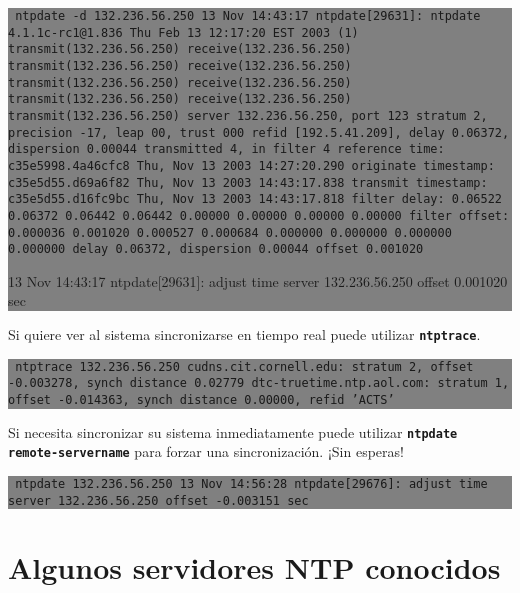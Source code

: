 \documentclass[12pt]{article}
\begin{document}
\colorbox{grey}{\parbox[t]{0.95\linewidth}{ \vspace*{0.5cm} {\tt 
ntpdate -d 132.236.56.250
13 Nov 14:43:17 ntpdate[29631]: ntpdate 4.1.1c-rc1@1.836 Thu Feb 13 12:17:20 EST 2003 (1)
transmit(132.236.56.250)
receive(132.236.56.250)
transmit(132.236.56.250)
receive(132.236.56.250)
transmit(132.236.56.250)
receive(132.236.56.250)
transmit(132.236.56.250)
receive(132.236.56.250)
transmit(132.236.56.250)
server 132.236.56.250, port 123
stratum 2, precision -17, leap 00, trust 000
refid [192.5.41.209], delay 0.06372, dispersion 0.00044
transmitted 4, in filter 4
reference time:    c35e5998.4a46cfc8  Thu, Nov 13 2003 14:27:20.290
originate timestamp: c35e5d55.d69a6f82  Thu, Nov 13 2003 14:43:17.838
transmit timestamp:  c35e5d55.d16fc9bc  Thu, Nov 13 2003 14:43:17.818
filter delay:  0.06522  0.06372  0.06442  0.06442
         0.00000  0.00000  0.00000  0.00000
filter offset: 0.000036 0.001020 0.000527 0.000684
         0.000000 0.000000 0.000000 0.000000
delay 0.06372, dispersion 0.00044
offset 0.001020

13 Nov 14:43:17 ntpdate[29631]: adjust time server 132.236.56.250 offset 0.001020 sec
 } \vspace*{0.5cm} } } 

Si quiere ver al sistema sincronizarse en tiempo real puede utilizar 
\texttt{\textbf{ntptrace}}.


\colorbox{grey}{\parbox[t]{0.95\linewidth}{ \vspace*{0.5cm} {\tt 
ntptrace 132.236.56.250
cudns.cit.cornell.edu: stratum 2, offset -0.003278, synch distance 0.02779
dtc-truetime.ntp.aol.com: stratum 1, offset -0.014363, synch distance 0.00000, refid 'ACTS' 
} \vspace*{0.5cm} } } 

	

	
	
Si necesita sincronizar su sistema inmediatamente puede utilizar
\texttt{\textbf{ntpdate remote-servername}} para forzar una sincronización. ¡Sin esperas!


\colorbox{grey}{\parbox[t]{0.95\linewidth}{ \vspace*{0.5cm} {\tt
ntpdate 132.236.56.250
13 Nov 14:56:28 ntpdate[29676]: adjust time server 132.236.56.250 offset -0.003151 sec
  } \vspace*{0.5cm} } } 


\section{ Algunos servidores NTP conocidos}
\end{document}
